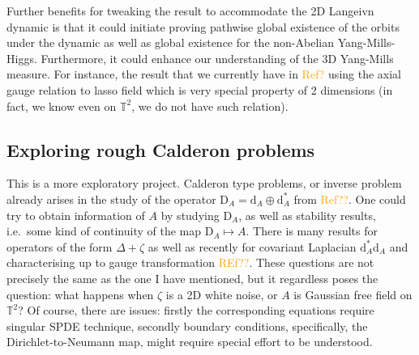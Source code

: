 \documentclass[12pt]{article}
\numberwithin{equation}{section}
\theoremstyle{definition}
\theoremstyle{remark}
\newcommand{\diff}{\mathrm{d}}
\newcommand{\1}{\mathbf 1}
\newcommand{\<}{\langle}
\renewcommand{\>}{\rangle}
\newcommand{\orange}[1]{\textcolor{orange}{#1}}
\newcommand{\rmD}{\mathrm{D}}
\newcommand{\bT}{\mathbb T}
\begin{document}
Further benefits for tweaking the result to accommodate the 2D Langeivn dynamic is that it could initiate proving pathwise global existence of the orbits under the dynamic as well as global existence for the non-Abelian Yang-Mills-Higgs. Furthermore,  it could enhance our understanding of the 3D Yang-Mills measure. For instance, the result that we currently have in \orange{Ref?} using the axial gauge relation to lasso field which is very special property of 2 dimensions (in fact, we know even on $\bT^2$, we do not have such relation).  


\subsection{Exploring rough Calderon problems}
This is a more exploratory project. Calderon type problems, or inverse problem already arises in the study of the operator $\rmD_A=\diff_A\oplus\diff_A^*$ from \orange{Ref??}. One could try to obtain information of $A$ by studying $\rmD_A$, as well as stability results, i.e.\ some kind of continuity of the map $\rmD_A\mapsto A$. There is many results for operators of the form $\Delta+\zeta$ as well as recently for covariant Laplacian $\diff_A^*\diff_A$ and characterising up to gauge transformation \orange{REf??}. These questions are not precisely the same as the one I have mentioned, but it regardless poses the question: what happens when $\zeta$ is a 2D white noise, or $A$ is Gaussian free field on $\mathbb T^2$? Of course, there are issues: firstly the corresponding equations require singular SPDE technique, secondly boundary conditions, specifically, the Dirichlet-to-Neumann map, might require special effort to be understood. 












\end{document}
